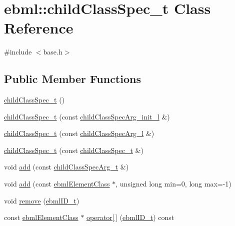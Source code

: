 \hypertarget{classebml_1_1childClassSpec__t}{}\section{ebml\+:\+:child\+Class\+Spec\+\_\+t Class Reference}
\label{classebml_1_1childClassSpec__t}


{\ttfamily \#include $<$base.\+h$>$}

\subsection*{Public Member Functions}
\begin{DoxyCompactItemize}
\item 
\mbox{\hyperlink{classebml_1_1childClassSpec__t_aa6909da591d9b10da355f7f0f44e21e6}{child\+Class\+Spec\+\_\+t}} ()
\item 
\mbox{\hyperlink{classebml_1_1childClassSpec__t_a97b0d1507fb1b33ec036e4e487380a22}{child\+Class\+Spec\+\_\+t}} (const \mbox{\hyperlink{namespaceebml_a40cf7ad4b58caaa8c07da3ed83f7a431}{child\+Class\+Spec\+Arg\+\_\+init\+\_\+l}} \&)
\item 
\mbox{\hyperlink{classebml_1_1childClassSpec__t_a1614563adfde1b6bf6d4a10ce978d892}{child\+Class\+Spec\+\_\+t}} (const \mbox{\hyperlink{namespaceebml_abf07998998c284c9be3f76b5d9e192e1}{child\+Class\+Spec\+Arg\+\_\+l}} \&)
\item 
\mbox{\hyperlink{classebml_1_1childClassSpec__t_a9a945ab15bfb7ef04184d44711e2f6cd}{child\+Class\+Spec\+\_\+t}} (const \mbox{\hyperlink{classebml_1_1childClassSpec__t}{child\+Class\+Spec\+\_\+t}} \&)
\item 
void \mbox{\hyperlink{classebml_1_1childClassSpec__t_a27e3d48fdee6bbd685c1bcc881f713f3}{add}} (const \mbox{\hyperlink{structebml_1_1childClassSpecArg__t}{child\+Class\+Spec\+Arg\+\_\+t}} \&)
\item 
void \mbox{\hyperlink{classebml_1_1childClassSpec__t_a7fd59c8442c52f42fedf490c9d912382}{add}} (const \mbox{\hyperlink{classebml_1_1ebmlElementClass}{ebml\+Element\+Class}} $\ast$, unsigned long min=0, long max=-\/1)
\item 
void \mbox{\hyperlink{classebml_1_1childClassSpec__t_a1eee1ea4974e2ad965e6020977349974}{remove}} (\mbox{\hyperlink{namespaceebml_a86c5f604ddf12a74aa9812e997a58691}{ebml\+I\+D\+\_\+t}})
\item 
const \mbox{\hyperlink{classebml_1_1ebmlElementClass}{ebml\+Element\+Class}} $\ast$ \mbox{\hyperlink{classebml_1_1childClassSpec__t_abef70f82f195bd41dae3d08d956553c5}{operator\mbox{[}$\,$\mbox{]}}} (\mbox{\hyperlink{namespaceebml_a86c5f604ddf12a74aa9812e997a58691}{ebml\+I\+D\+\_\+t}}) const

\end{DoxyCompactItemize}
